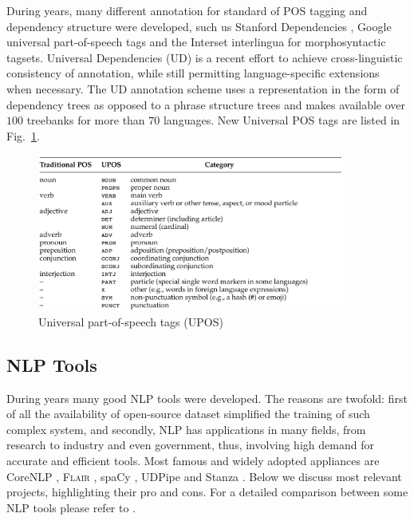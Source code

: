During years, many different annotation for standard of POS tagging
and dependency structure were developed, such us Stanford Dependencies
\cite{de2006generating, de2008stanford, silveira2014gold}, Google
universal part-of-speech tags \cite{lin2012syntactic} and the Interset
interlingua \cite{zeman2008reusable} for morphosyntactic tagsets.
Universal Dependencies (UD) \cite{nivre2016universal,
nivre2017universal} is a recent effort to achieve cross-linguistic
consistency of annotation, while still permitting language-specific
extensions when necessary. The UD annotation scheme uses a
representation in the form of dependency trees as opposed to a phrase
structure trees and makes available over $100$ treebanks for more than
$70$ languages. New Universal POS tags are listed in
Fig.~\ref{fig:upos-tags}.

\begin{figure}
  \centering
  \includegraphics[width=0.9\textwidth]{figures/upos-tags.png}
  \caption[Universal POS tags]{Universal part-of-speech tags (UPOS) \cite{nivre2017universal}}
  \label{fig:upos-tags}
\end{figure}
 
\subsection{NLP Tools}
\label{subsec:nlp-tools}

During years many good NLP tools were developed. The reasons are
twofold: first of all the availability of open-source dataset
simplified the training of such complex system, and secondly, NLP has
applications in many fields, from research to industry and even
government, thus, involving high demand for accurate and efficient
tools. Most famous and widely adopted appliances are CoreNLP
\cite{manning2014stanford}, \textsc{Flair} \cite{akbik2019flair},
spaCy \cite{honnibal2020spacy}, UDPipe \cite{straka2018udpipe} and
Stanza \cite{qi2020stanza}. Below we discuss most relevant projects,
highlighting their pro and cons. For a detailed comparison between
some NLP tools please refer to \cite{schmitt2019replicable}.

